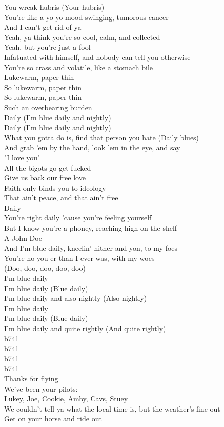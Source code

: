 You wreak hubris (Your hubris) \\
You're like a yo-yo mood swinging, tumorous cancer \\
And I can't get rid of ya \\
Yeah, ya think you're so cool, calm, and collected \\
Yeah, but you're just a fool \\
Infatuated with himself, and nobody can tell you otherwise \\
You're so crass and volatile, like a stomach bile \\
Lukewarm, paper thin \\
So lukewarm, paper thin \\
So lukewarm, paper thin \\
Such an overbearing burden \\

Daily (I'm blue daily and nightly) \\
Daily (I'm blue daily and nightly) \\

What you gotta do is, find that person you hate (Daily blues) \\
And grab 'em by the hand, look 'em in the eye, and say \\
"I love you" \\
All the bigots go get fucked \\
Give us back our free love \\
Faith only binds you to ideology \\
That ain't peace, and that ain't free \\
Daily \\

You're right daily 'cause you're feeling yourself \\
But I know you're a phoney, reaching high on the shelf \\
A John Doe \\
And I'm blue daily, kneelin' hither and yon, to my foes \\
You're no you-er than I ever was, with my woes \\

(Doo, doo, doo, doo, doo) \\
I'm blue daily \\
I'm blue daily (Blue daily) \\
I'm blue daily and also nightly (Also nightly) \\
I'm blue daily \\
I'm blue daily (Blue daily) \\
I'm blue daily and quite rightly (And quite rightly) \\

b741 \\
b741 \\
b741 \\
b741 \\
Thanks for flying \\
We've been your pilots: \\
Lukey, Joe, Cookie, Amby, Cavs, Stuey \\
We couldn't tell ya what the local time is, but the weather's fine out \\
Get on your horse and ride out \\
